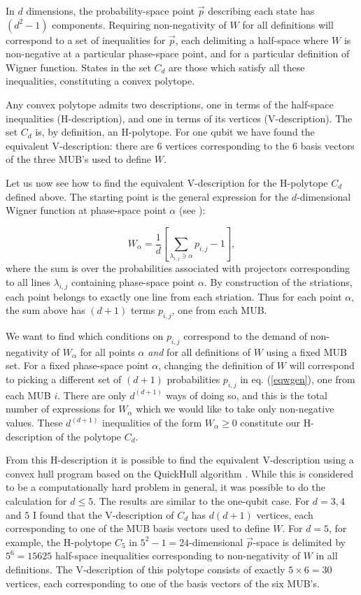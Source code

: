 \documentclass[aps,twocolumn,showpacs,nofootinbib,groupedaddress]{revtex4}
\begin{document}
In $d$ dimensions, the probability-space point $\vec{p}$
describing each state has $(d^2-1)$ components. Requiring
non-negativity of $W$ for all definitions will correspond to a set
of inequalities for $\vec{p}$, each delimiting a half-space where
$W$ is non-negative at a particular phase-space point, and for a
particular definition of Wigner function. States in the set $C_d$
are those which satisfy all these inequalities, constituting a
convex polytope.

Any convex polytope admits two descriptions, one in terms of the
half-space inequalities (H-description), and one in terms of its
vertices (V-description). The set $C_d$  is, by definition, an
H-polytope. For one qubit we have found the equivalent
V-description: there are $6$ vertices corresponding to the $6$
basis vectors of the three MUB's used to define $W$.

Let us now see how to find the equivalent V-description for the
H-polytope $C_d$ defined above. The starting point is the general
expression for the $d$-dimensional Wigner function at phase-space
point $\alpha$ (see \cite{GibbonsHW04}):

\begin{equation}
W_{\alpha}=\frac{1}{d}\left[ \sum_{\lambda_{i,j} \ni
\alpha}p_{i,j}-1  \right],\label{eqwgen}
\end{equation}
where the sum is over the probabilities associated with projectors
corresponding to all lines $\lambda_{i,j}$ containing phase-space
point $\alpha$. By construction of the striations, each point
belongs to exactly one line from each striation. Thus for each
point $\alpha$,  the sum above has $(d+1)$ terms $p_{i,j}$, one
from each MUB.

We want to find which conditions on $p_{i,j}$ correspond to the
demand of non-negativity of $W_{\alpha}$ for all points $\alpha$
\textit{and} for all definitions of $W$ using a fixed MUB set. For
a fixed phase-space point $\alpha$, changing the definition of $W$
will correspond to picking a different set of $(d+1)$
probabilities $p_{i,j}$ in eq. (\ref{eqwgen}), one from each MUB
$i$. There are only $d^{(d+1)}$ ways of doing so, and this is the
total number of expressions for $W_{\alpha}$ which we would like
to take only non-negative values. These $d^{(d+1)}$ inequalities
of the form $W_{\alpha}\ge0$ constitute our H-description of the
polytope $C_d$.

From this H-description it is possible to find the equivalent
V-description using a convex hull program based on the QuickHull
algorithm \cite{BarberDH96}. While this is considered to be a
computationally hard problem in general, it was possible to do the
calculation for $d\le5$. The results are similar to the one-qubit
case. For $d=3,4$ and $5$ I found that the V-description of $C_d$
has $d(d+1)$ vertices, each corresponding to one of the MUB basis
vectors used to define $W$. For $d=5$, for example, the H-polytope
$C_5$ in $5^2-1=24$-dimensional $\vec{p}$-space is delimited by
$5^6=15625$ half-space inequalities corresponding to
non-negativity of $W$ in all definitions. The V-description of
this polytope consists of exactly $5 \times 6=30$ vertices, each
corresponding to one of the basis vectors of the six MUB's.
\end{document}
